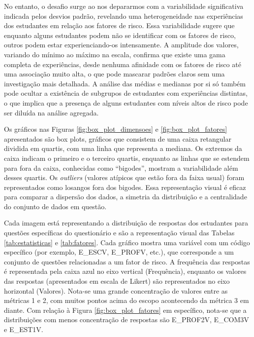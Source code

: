 No entanto, o desafio surge ao nos depararmos com a variabilidade significativa indicada pelos desvios padrão, revelando uma heterogeneidade nas experiências dos estudantes em relação aos fatores de risco. Essa variabilidade sugere que enquanto alguns estudantes podem não se identificar com os fatores de risco, outros podem estar experienciando-os intensamente. A amplitude dos valores, variando do mínimo ao máximo na escala, confirma que existe uma gama completa de experiências, desde nenhuma afinidade com os fatores de risco até uma associação muito alta, o que pode mascarar padrões claros sem uma investigação mais detalhada. A análise das médias e medianas por si só também pode ocultar a existência de subgrupos de estudantes com experiências distintas, o que implica que a presença de alguns estudantes com níveis altos de risco pode ser diluída na análise agregada. 


Os gráficos nas Figuras \ref{fig:box_plot_dimensoes} e \ref{fig:box_plot_fatores} apresentados são box plots, gráficos que consistem de uma caixa retangular dividida em quartis, com uma linha que representa a mediana. Os extremos da caixa indicam o primeiro e o terceiro quartis, enquanto as linhas que se estendem para fora da caixa, conhecidas como ``bigodes'', mostram a variabilidade além desses quartis. Os \textit{outliers} (valores atípicos que estão fora da faixa usual) foram representados como losangos fora dos bigodes. Essa representação visual é eficaz para comparar a dispersão dos dados, a simetria da distribuição e a centralidade do conjunto de dados em questão. 

Cada imagem está representando a distribuição de respostas dos estudantes para questões específicas do questionário e são a representação visual das Tabelas \ref{tab:estatisticas} e \ref{tab:fatores}. Cada gráfico mostra uma variável com um código específico (por exemplo, E\_ESCV, E\_PROFV, etc.), que corresponde a um conjunto de questões relacionadas a um fator de risco. A frequência das respostas é representada pela caixa azul no eixo vertical (Frequência), enquanto os valores das respostas (apresentados em escala de Likert) são representados no eixo horizontal (Valores). Nota-se uma grande concentração de valores entre as métricas 1 e 2, com muitos pontos acima do escopo acontecendo da métrica 3 em diante. Com relação à Figura \ref{fig:box_plot_fatores} em específico, nota-se que a distribuições com menos concentração de respostas são E\_PROF2V, E\_COM3V e E\_EST1V.

